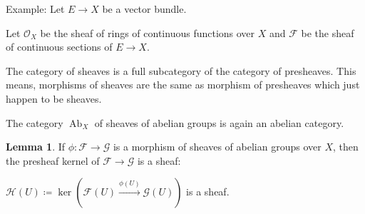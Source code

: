 \documentclass{article}
\theoremstyle{definition}
\newtheorem{lemma}[theorem]{Lemma}
\begin{document}
    Example: Let \(E \to X\) be a vector bundle.

    Let \(\mathcal{O}_X\) be the sheaf of rings of continuous functions over \(X\) and \(\mathcal{F}\) be the sheaf of continuous sections of \(E \to X\).

    The category of sheaves is a full subcategory of the category of presheaves. This means, morphisms of sheaves are the same as morphism of presheaves which just happen to be sheaves.

    The category \(\operatorname{Ab}_X\) of sheaves of abelian groups is again an abelian category.

    \begin{lemma}
        If \(\phi : \mathcal{F} \to \mathcal{G}\) is a morphism of sheaves of abelian groups over \(X\), then the presheaf kernel of \(\mathcal{F} \to \mathcal{G}\) is a sheaf:

        \(\mathcal{H} (U) \coloneqq \ker \left(\mathcal{F}(U) \xrightarrow{\phi(U)} \mathcal{G}(U)\right)\) is a sheaf.
    \end{lemma}
\end{document}
